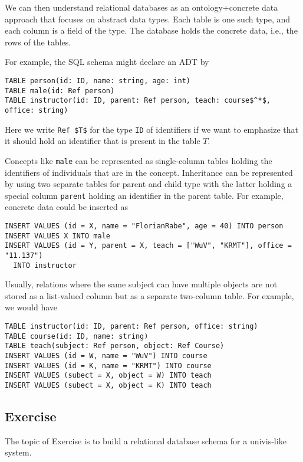 We can then understand relational databases as an ontology+concrete data approach that focuses on abstract data types.
Each table is one such type, and each column is a field of the type.
The database holds the concrete data, i.e., the rows of the tables.

For example, the SQL schema might declare an ADT by
\begin{lstlisting}
TABLE person(id: ID, name: string, age: int)
TABLE male(id: Ref person)
TABLE instructor(id: ID, parent: Ref person, teach: course$^*$, office: string)
\end{lstlisting}
Here we write \lstinline|Ref $T$| for the type \lstinline|ID| of identifiers if we want to emphasize that it should hold an identifier that is present in the table $T$.

Concepts like \lstinline|male| can be represented as single-column tables holding the identifiers of individuals that are in the concept.
Inheritance can be represented by using two separate tables for parent and child type with the latter holding a special column \lstinline|parent| holding an identifier in the parent table.
For example, concrete data could be inserted as

\begin{lstlisting}
INSERT VALUES (id = X, name = "FlorianRabe", age = 40) INTO person
INSERT VALUES X INTO male
INSERT VALUES (id = Y, parent = X, teach = ["WuV", "KRMT"], office = "11.137")
  INTO instructor
\end{lstlisting}

Usually, relations where the same subject can have multiple objects are not stored as a list-valued column but as a separate two-column table.
For example, we would have
\begin{lstlisting}
TABLE instructor(id: ID, parent: Ref person, office: string)
TABLE course(id: ID, name: string)
TABLE teach(subject: Ref person, object: Ref Course)
INSERT VALUES (id = W, name = "WuV") INTO course
INSERT VALUES (id = K, name = "KRMT") INTO course
INSERT VALUES (subect = X, object = W) INTO teach
INSERT VALUES (subect = X, object = K) INTO teach
\end{lstlisting}


\subsection{Exercise}

The topic of Exercise is to build a relational database schema for a univis-like system.

